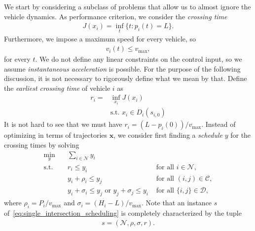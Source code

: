\documentclass[a4paper]{article}
\theoremstyle{definition}
\theoremstyle{plain}
\begin{document}
We start by considering a subclass of problems that allow us to almost ignore
the vehicle dynamics. As performance criterion, we consider the \textit{crossing
  time}
\begin{align}
  \label{eq:crossing_time_criterion}
  J(x_{i}) = \inf_{t} \{ t : p_{i}(t) = L \} .
\end{align}
Furthermore, we impose a maximum speed for every vehicle, so
\begin{align}
  \label{eq:max_speed_constraint}
  v_{i}(t) \leq v_\text{max} ,
\end{align}
for every $t$. We do not define any linear constraints on the control input, so
we assume \textit{instantaneous acceleration} is possible. For the purpose of
the following discussion, it is not necessary to rigorously define what we mean
by that. Define the \textit{earliest crossing time} of vehicle $i$ as
\begin{align*}
  r_{i} = &\inf_{x_{i}} J(x_{i}) \\
  &\text{s.t. } x_{i} \in D_{i}(s_{i,0})
\end{align*}
It is not hard to see that we must have $r_{i} = (L - p_{i}(0)) / v_\text{max}$.
%
Instead of optimizing in terms of trajectories $\mathbf{x}$, we consider first
finding a \textit{schedule} $y$ for the crossing times by solving
\begin{subequations}\label{eq:single_intersection_scheduling}
\begin{align}
  \min_{y} \quad & \sum_{i \in \mathcal{N}} y_{i} & \\
  \text{s.t.} \quad & r_{i} \leq y_{i} & \text{ for all } i \in \mathcal{N} , \\
  & y_{i} + \rho_{i} \leq y_{j} & \text{ for all } (i,j) \in \mathcal{C} , \label{eq:conjunctions} \\
  & y_{i} + \sigma_{i} \leq y_{j} \text{ or } y_{j} + \sigma_{j} \leq y_{i} & \text{ for all } \{i,j\} \in \mathcal{D} , \label{eq:disjunctions}
\end{align}
\end{subequations}
where $\rho_{i} = P_{i} / v_{\text{max}}$ and
$\sigma_{i} = (H_{i} - L) / v_{\text{max}}$.
%
Note that an instance $s$ of~\eqref{eq:single_intersection_scheduling} is completely characterized by the tuple
\begin{align*}
  s = (\mathcal{N}, \rho, \sigma, r) .
\end{align*}
\end{document}
